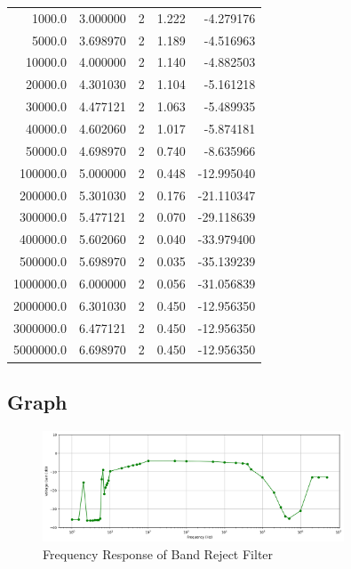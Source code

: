 \documentclass[12pt]{article}
\begin{document}
\begin{table}[h!]
\begin{tabular}{rrrrr}
        1000.0 & 3.000000 &    2 & 1.222 &  -4.279176 \\
        5000.0 & 3.698970 &    2 & 1.189 &  -4.516963 \\
        10000.0 & 4.000000 &    2 & 1.140 &  -4.882503 \\
        20000.0 & 4.301030 &    2 & 1.104 &  -5.161218 \\
        30000.0 & 4.477121 &    2 & 1.063 &  -5.489935 \\
        40000.0 & 4.602060 &    2 & 1.017 &  -5.874181 \\
        50000.0 & 4.698970 &    2 & 0.740 &  -8.635966 \\
        100000.0 & 5.000000 &    2 & 0.448 & -12.995040 \\
        200000.0 & 5.301030 &    2 & 0.176 & -21.110347 \\
        300000.0 & 5.477121 &    2 & 0.070 & -29.118639 \\
        400000.0 & 5.602060 &    2 & 0.040 & -33.979400 \\
        500000.0 & 5.698970 &    2 & 0.035 & -35.139239 \\
        1000000.0 & 6.000000 &    2 & 0.056 & -31.056839 \\
        2000000.0 & 6.301030 &    2 & 0.450 & -12.956350 \\
        3000000.0 & 6.477121 &    2 & 0.450 & -12.956350 \\
        5000000.0 & 6.698970 &    2 & 0.450 & -12.956350 \\
        \hline
    \end{tabular}
\end{table}

\newpage
\subsection{Graph}

\begin{figure}[h]
    \centering
    \includegraphics[width=0.8\textwidth]{BRF_Graph.png}
    \caption{Frequency Response of Band Reject Filter}
\end{figure}
\end{document}
